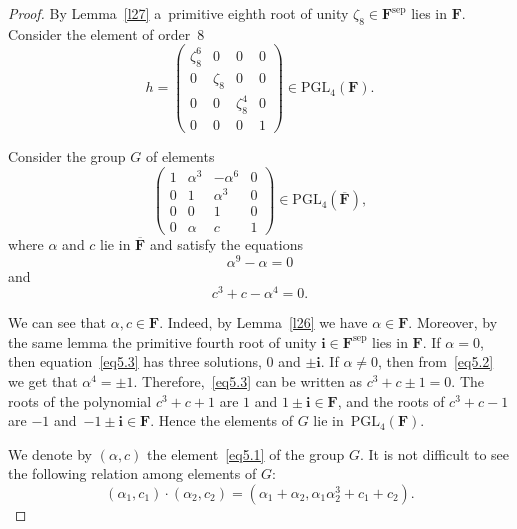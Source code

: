 \documentclass{amsart}
\numberwithin{equation}{section}
\theoremstyle{plain}
\theoremstyle{definition}
\theoremstyle{remark}
\begin{document}
\begin{proof}
By Lemma~\ref{l27} a~primitive eighth root of unity
$\zeta_8 \in \mathbf{F}^{\mathrm{sep}}$
lies in $\mathbf{F}$. Consider the element of order~$8$
$$
h=\begin{pmatrix}
\zeta_8^6 & 0 & 0 & 0\\
0 & \zeta_8 & 0 & 0\\
0 & 0 & \zeta_8^4 & 0\\
0 & 0 & 0 & 1
\end{pmatrix} \in \mathrm{PGL}_4(\mathbf{F}).
$$

Consider the group $G$ of elements
\begin{equation}
\label{eq5.1}
\begin{pmatrix}
1 & \alpha^3 & -\alpha^6 & 0\\
0 & 1 & \alpha^3 & 0\\
0 & 0 & 1 & 0\\
0 & \alpha & c & 1
\end{pmatrix} \in \mathrm{PGL}_4(\overline{\mathbf{F}}),
\end{equation}
where $\alpha$ and $c$ lie in $\overline{\mathbf{F}}$ and satisfy the equations
\begin{equation}
\alpha^9-\alpha=0 \label{eq5.2}
\end{equation}
and
\begin{equation}
c^3+c-\alpha^4=0. \label{eq5.3}
\end{equation}

We can see that $\alpha, c \in \mathbf{F}$. Indeed, by Lemma~\ref{l26} we have $\alpha \in \mathbf{F}$. Moreover, by the same lemma the primitive fourth root of unity $\mathbf{i} \in \mathbf{F}^{\mathrm{sep}}$ lies in $\mathbf{F}$. If $\alpha=0$, then equation~\eqref{eq5.3} has three solutions, $0$ and $\pm \mathbf{i}$. If $\alpha \neq 0$, then from~\eqref{eq5.2} we get that $\alpha^4=\pm 1$. Therefore,~\eqref{eq5.3} can be written as $c^3+c \pm 1=0$. The roots of the polynomial $c^3+c+1$ are $1$ and $1 \pm \mathbf{i} \in \mathbf{F}$, and the roots of $c^3+c-1$ are $-1$ and~\mbox{$-1 \pm \mathbf{i} \in \mathbf{F}$.} Hence the elements of $G$ lie in~$\mathrm{PGL}_4(\mathbf{F})$.

We denote by $(\alpha,c)$ the element~\eqref{eq5.1} of the group $G$. It is not difficult to see the following relation among elements of $G$:
\begin{equation}
\label{eq5.4}
(\alpha_1, c_1) \cdot (\alpha_2,c_2)=(\alpha_1+\alpha_2, \alpha_1\alpha_2^3+c_1+c_2).
\end{equation}


\end{proof}
\end{document}
